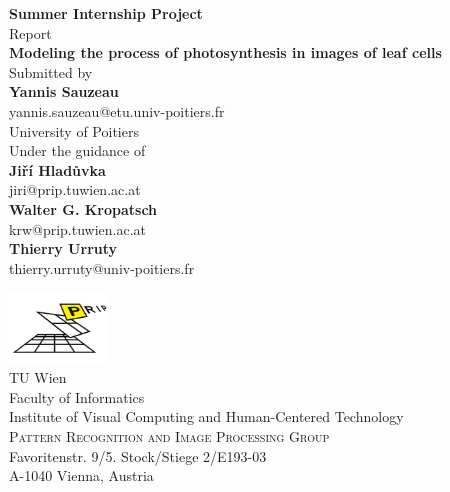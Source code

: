 \begin{titlepage}

\begin{center}

\textup{\small {\bf Summer Internship Project} \\ Report}\\[0.3in]

\Large \textbf {Modeling the process of photosynthesis in images of leaf cells}\\[0.7in]

\normalsize Submitted by \\[0.2in]
\textbf{Yannis Sauzeau}\\
yannis.sauzeau@etu.univ-poitiers.fr\\
University of Poitiers\\

\vspace{.2in}
Under the guidance of\\[0.2in]
\textbf{Jiří Hladůvka}\\
jiri@prip.tuwien.ac.at\\
\vspace{0.1cm}
\textbf{Walter G. Kropatsch}\\
krw@prip.tuwien.ac.at\\
\vspace{0.1cm}
\textbf{Thierry Urruty}\\
thierry.urruty@univ-poitiers.fr



\vspace{.3in}

\includegraphics[width=0.2\textwidth]{figures/prip.png}\\[0.1in]
\Large{
TU Wien\\
\vspace{0.1cm}
Faculty of Informatics\\
\vspace{0.1cm}
Institute of Visual Computing and Human-Centered Technology}\\
\normalsize
\vspace{0.25cm}
\textsc{Pattern Recognition and Image Processing Group}\\
\vspace{0.15cm}
Favoritenstr. 9/5. Stock/Stiege 2/E193-03\\
A-1040 Vienna, Austria \\

\end{center}

\end{titlepage}
